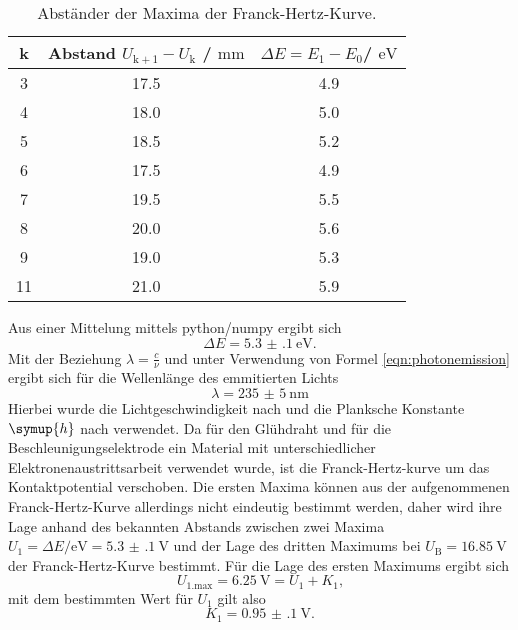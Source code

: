\begin{table}
	\centering
	\caption{Abständer der Maxima der Franck-Hertz-Kurve.}
	\label{tab:hertzchen}
	\begin{tabular}{ccc}
		\toprule
		k& Abstand $U_{\mathrm{k+1}}-U_{\mathrm{k}}$ / $\si{\milli\meter}$ & $\Delta E=E_1 - E_0$/ $\si{\electronvolt}$ \\
		\midrule
3&17.5 & 4.9\\
4&18.0 & 5.0\\
5&18.5 & 5.2\\
6&17.5 & 4.9\\
7&19.5 & 5.5\\
8&20.0 & 5.6\\
9&19.0 & 5.3\\
11&21.0 & 5.9\\
\end{tabular}
\end{table}

Aus einer Mittelung mittels python/numpy \cite{numpy} ergibt sich
\begin{equation}
	\Delta E=\SI{5.3(1)}{\electronvolt} \mathrm{.}
\end{equation}
Mit der Beziehung $\lambda=\frac{c}{\nu}$ und unter Verwendung von Formel
\eqref{eqn:photonemission} ergibt sich für die Wellenlänge des emmitierten Lichts
\begin{equation}
	\lambda=\SI{235(5)}{\nano\meter}
\end{equation}
Hierbei wurde die Lichtgeschwindigkeit nach \cite{c} und die Planksche Konstante $\symup{h}$ nach \cite{h} verwendet.
Da für den Glühdraht und für die Beschleunigungselektrode ein Material mit unterschiedlicher Elektronenaustrittsarbeit verwendet wurde, ist die Franck-Hertz-kurve um das Kontaktpotential verschoben.
Die ersten Maxima können aus der aufgenommenen Franck-Hertz-Kurve allerdings nicht eindeutig bestimmt werden, daher wird ihre Lage anhand des bekannten Abstands zwischen zwei Maxima $U_1=\Delta E/\si{\electronvolt}=\SI{5.3(1)}{\volt}$ und der Lage des dritten Maximums bei $U_\mathrm{B}=\SI{16.85}{\volt}$ der Franck-Hertz-Kurve bestimmt.
Für die Lage des ersten Maximums ergibt sich
\begin{equation}
	U_\mathrm{1.max}=\SI{6.25}{\volt}=U_1+K_1 \text{,}
\end{equation}
mit dem bestimmten Wert für $U_1$ gilt also
\begin{equation}
	K_1=\SI{0.95(10)}{\volt}\text{.}
\end{equation}


\FloatBarrier

